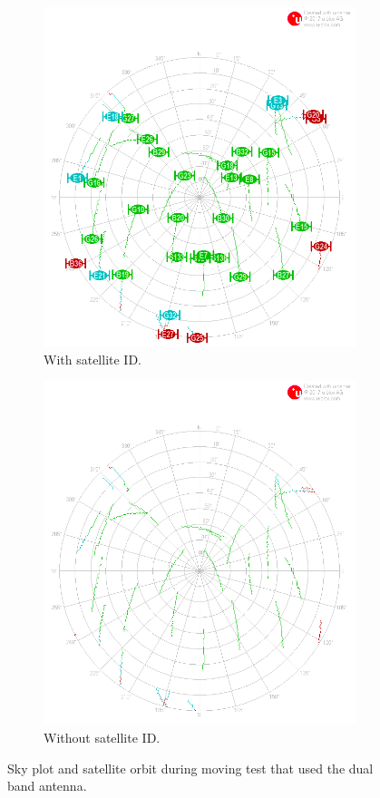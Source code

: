 \documentclass[letterpaper, 10 pt,onecolumn]{article}
\begin{document}
	\begin{figure}[H]
		\centering
		\begin{subfigure}{.5\textwidth}
			\includegraphics[width=0.9\linewidth]{../Moving_DualBand/skyplot.png}
			\caption{	
				With satellite ID.}
			\label{fig:mt2_sky}
		\end{subfigure}%
		\begin{subfigure}{.5\textwidth}
			\includegraphics[width=0.9\linewidth]{../Moving_DualBand/skyplot_orbit.png}
			\caption{	
				Without satellite ID.}
			\label{fig:mt2_obt}
		\end{subfigure}
		\caption[short]{Sky plot and satellite orbit during moving test that used the dual band antenna.}
		\label{fig:mt2}
	\end{figure}
	
\end{document}
